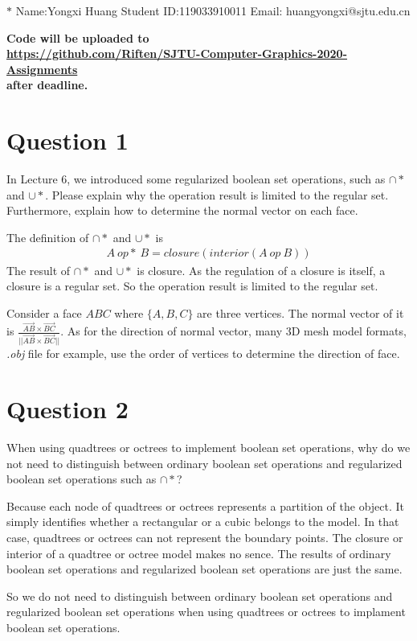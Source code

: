 \documentclass[12pt,a4paper]{article}
\makeatletter
\newtheorem*{solution}{Solution}
\theoremstyle{definition}
\numberwithin{equation}{section}
\numberwithin{figure}{section}
\renewenvironment{solution}[1][Solution] {\par\pushQED{\qed}\normalfont\topsep6\p@\@plus6\p@\relax\trivlist\item[\hskip\labelsep\bfseries#1\@addpunct{.}]\ignorespaces}{\popQED\endtrivlist\@endpefalse} \makeatother
\makeatother
\begin{document}
\noindent

\noindent{}
\begin{center}

\footnotesize{\color{blue}$*$ Name:Yongxi Huang  \quad Student ID:119033910011 \quad Email: huangyongxi@sjtu.edu.cn}
\end{center}

\noindent\textbf{Code will be uploaded to \\
	\url{https://github.com/Riften/SJTU-Computer-Graphics-2020-Assignments}\\
	 after deadline.}

\section{Question 1}
In Lecture 6,  we introduced some regularized boolean set operations, such as $\cap *$ and $\cup*$. Please explain why the operation result is limited to the regular set. Furthermore, explain how to determine the normal vector on each face.

\begin{solution}
	The definition of $\cap*$ and $\cup*$ is 
	\begin{align*}
	A~op*~B=closure(interior(A~op~B))
	\end{align*}
	The result of $\cap*$ and $\cup*$ is closure. As the regulation of a closure is itself, a closure is a regular set. So the operation result is limited to the regular set.
	
	Consider a face $ABC$ where $\{A,B,C\}$ are three vertices. The normal vector of it is $\frac{\vec{AB}\times \vec{BC}}{||\vec{AB}\times \vec{BC}||}$. As for the direction of normal vector, many 3D mesh model formats, \textit{.obj} file for example, use the order of vertices to determine the direction of face.
\end{solution}

\section{Question 2}
When using quadtrees or octrees to implement boolean set operations, why do we not need to distinguish between ordinary boolean set operations and regularized boolean set operations such as $\cap*$?

\begin{solution}
	Because each node of quadtrees or octrees represents a partition of the object. It simply identifies whether a rectangular or a cubic belongs to the model. In that case, quadtrees or octrees can not represent the boundary points. The closure or interior of a quadtree or octree model makes no sence. The results of ordinary boolean set operations and regularized boolean set operations are just the same.
	
	So we do not need to distinguish between ordinary boolean set operations and regularized boolean set operations when using quadtrees or octrees to implament boolean set operations.
\end{solution}

%
\end{document}
